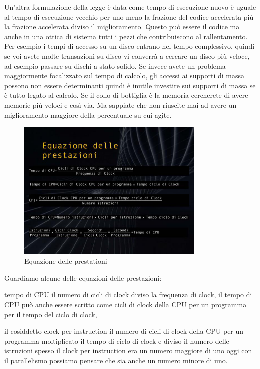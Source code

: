 Un'altra formulazione della legge è data come tempo di esecuzione nuovo è uguale al tempo di esecuzione vecchio per uno meno la frazione del codice accelerata più la frazione accelerata diviso il miglioramento.
Questo può essere il codice ma anche in una ottica di sistema tutti i pezzi che contribuiscono al rallentamento.
Per esempio i tempi di accesso su un disco entrano nel tempo complessivo, quindi se voi avete molte transazioni su disco vi converrà a cercare un disco più veloce, ad esempio passare su dischi a stato solido.
Se invece avete un problema maggiormente focalizzato sul tempo di calcolo, gli accessi ai supporti di massa possono non essere determinanti quindi è inutile investire sui supporti di massa se è tutto legato al calcolo.
Se il collo di bottiglia è la memoria cercherete di avere memorie più veloci e così via.
Ma sappiate che non riuscite mai ad avere un miglioramento maggiore della percentuale su cui agite.

\FloatBarrier
\begin{figure}[H]
  \centering
  \includegraphics[width=0.80\textwidth,
                    trim=10 40 10 40, %
                    clip]
                    {images/Lez03_p04_fig_06.png}
  \caption{Equazione delle prestationi}
  \label{fig:Lez03_p04_fig_06}
\end{figure}
\FloatBarrier
\noindent

Guardiamo alcune delle equazioni delle prestazioni: 

tempo di CPU il numero di cicli di clock diviso la frequenza di clock, il tempo di CPU può anche essere scritto come cicli di clock della CPU per un programma per il tempo del ciclo di clock, 

il cosiddetto clock per instruction il numero di cicli di clock della CPU per un programma moltiplicato il tempo di ciclo di clock e diviso il numero delle istruzioni spesso il clock per instruction era un numero maggiore di uno oggi con il parallelismo possiamo pensare che sia anche un numero minore di uno.

